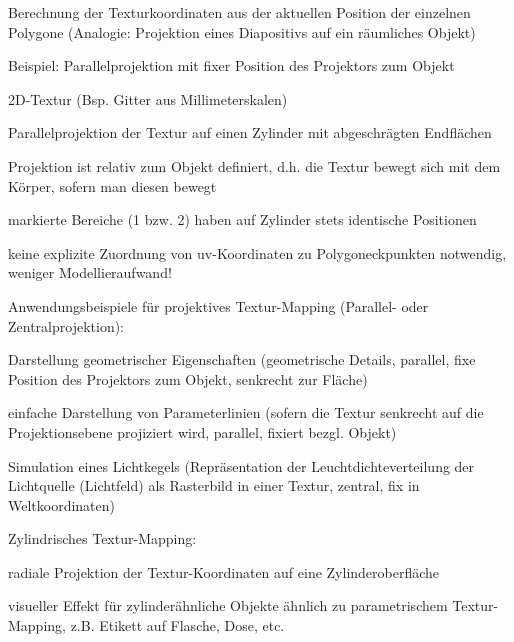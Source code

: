 \documentclass[landscape]{article}
\begin{document}
\begin{multicols}{3}
  Berechnung der Texturkoordinaten aus der aktuellen Position der einzelnen Polygone (Analogie: Projektion eines Diapositivs auf ein räumliches Objekt)
  
  Beispiel: Parallelprojektion mit fixer Position des Projektors zum Objekt
  \begin{itemize*}
    \item 2D-Textur (Bsp. Gitter aus Millimeterskalen)
    \item Parallelprojektion der Textur auf einen Zylinder mit abgeschrägten Endflächen
    \item Projektion ist relativ zum Objekt definiert, d.h. die Textur bewegt sich mit dem Körper, sofern man diesen bewegt
    \item markierte Bereiche (1 bzw. 2) haben auf Zylinder stets identische Positionen
    \item keine explizite Zuordnung von uv-Koordinaten zu Polygoneckpunkten notwendig, weniger Modellieraufwand!
  \end{itemize*}
  
  Anwendungsbeispiele für projektives Textur-Mapping (Parallel- oder Zentralprojektion):
  \begin{itemize*}
    \item Darstellung geometrischer Eigenschaften (geometrische Details, parallel, fixe Position des Projektors zum Objekt, senkrecht zur Fläche)
    \item einfache Darstellung von Parameterlinien (sofern die Textur senkrecht auf die Projektionsebene projiziert wird, parallel, fixiert bezgl. Objekt)
    \item Simulation eines Lichtkegels (Repräsentation der Leuchtdichteverteilung der Lichtquelle (Lichtfeld) als Rasterbild in einer Textur, zentral, fix in Weltkoordinaten)
  \end{itemize*}
  
  Zylindrisches Textur-Mapping:
  \begin{itemize*}
    \item radiale Projektion der Textur-Koordinaten auf eine Zylinderoberfläche
    \item visueller Effekt für zylinderähnliche Objekte ähnlich zu parametrischem Textur-Mapping, z.B. Etikett auf Flasche, Dose, etc.
  \end{itemize*}
  

\end{multicols}
\end{document}
